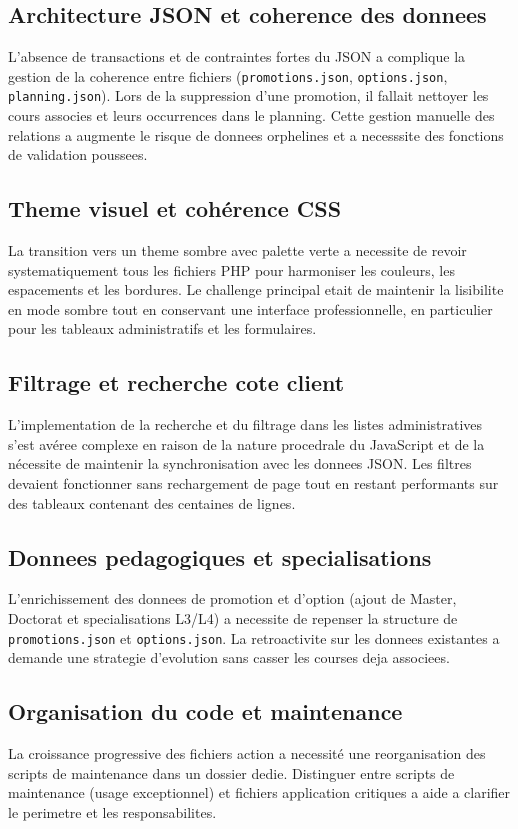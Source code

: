 \documentclass[12pt,a4paper]{article}
\begin{document}
\subsection{Architecture JSON et coherence des donnees}
L'absence de transactions et de contraintes fortes du JSON a complique la gestion de la coherence entre fichiers (\texttt{promotions.json}, \texttt{options.json}, \texttt{planning.json}).
Lors de la suppression d'une promotion, il fallait nettoyer les cours associes et leurs occurrences dans le planning.
Cette gestion manuelle des relations a augmente le risque de donnees orphelines et a necesssite des fonctions de validation poussees.

\subsection{Theme visuel et cohérence CSS}
La transition vers un theme sombre avec palette verte a necessite de revoir systematiquement tous les fichiers PHP pour harmoniser les couleurs, les espacements et les bordures.
Le challenge principal etait de maintenir la lisibilite en mode sombre tout en conservant une interface professionnelle, en particulier pour les tableaux administratifs et les formulaires.

\subsection{Filtrage et recherche cote client}
L'implementation de la recherche et du filtrage dans les listes administratives s'est avéree complexe en raison de la nature procedrale du JavaScript et de la nécessite de maintenir la synchronisation avec les donnees JSON.
Les filtres devaient fonctionner sans rechargement de page tout en restant performants sur des tableaux contenant des centaines de lignes.

\subsection{Donnees pedagogiques et specialisations}
L'enrichissement des donnees de promotion et d'option (ajout de Master, Doctorat et specialisations L3/L4) a necessite de repenser la structure de \texttt{promotions.json} et \texttt{options.json}.
La retroactivite sur les donnees existantes a demande une strategie d'evolution sans casser les courses deja associees.

\subsection{Organisation du code et maintenance}
La croissance progressive des fichiers action a necessité une reorganisation des scripts de maintenance dans un dossier dedie.
Distinguer entre scripts de maintenance (usage exceptionnel) et fichiers application critiques a aide a clarifier le perimetre et les responsabilites.
\end{document}

